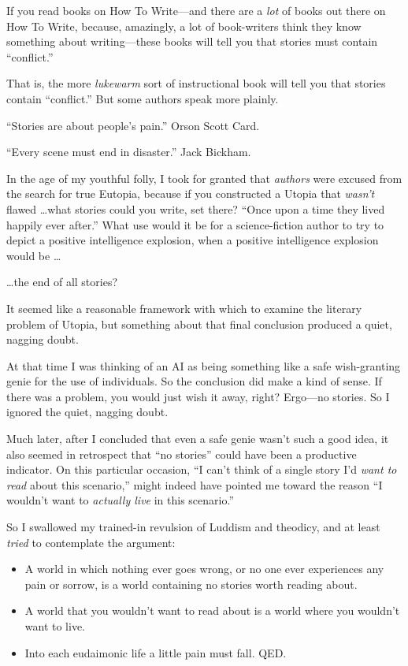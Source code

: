 {
 If you read books on How To Write---and there are a \textit{lot}
of books out there on How To Write, because, amazingly, a lot of
book-writers think they know something about writing---these books will
tell you that stories must contain
``conflict.''}

{
 That is, the more \textit{lukewarm} sort of instructional book
will tell you that stories contain
``conflict.'' But some authors speak
more plainly.}

{
 ``Stories are about people's
pain.'' Orson Scott Card.}

{
 ``Every scene must end in
disaster.'' Jack Bickham.}

{
 In the age of my youthful folly, I took for granted that
\textit{authors} were excused from the search for true Eutopia, because
if you constructed a Utopia that \textit{wasn't} flawed
\ldots what stories could you write, set there? ``Once
upon a time they lived happily ever after.'' What use
would it be for a science-fiction author to try to depict a positive
intelligence explosion, when a positive intelligence explosion would be
\ldots}

{
 \ldots the end of all stories?}

{
 It seemed like a reasonable framework with which to examine the
literary problem of Utopia, but something about that final conclusion
produced a quiet, nagging doubt.}

{
 At that time I was thinking of an AI as being something like a
safe wish-granting genie for the use of individuals. So the conclusion
did make a kind of sense. If there was a problem, you would just wish
it away, right? Ergo---no stories. So I ignored the quiet, nagging
doubt.}

{
 Much later, after I concluded that even a safe genie
wasn't such a good idea, it also seemed in retrospect
that ``no stories'' could have been
a productive indicator. On this particular occasion,
``I can't think of a single story
I'd \textit{want to read} about this
scenario,'' might indeed have pointed me toward the
reason ``I wouldn't want to
\textit{actually live} in this scenario.''}

{
 So I swallowed my trained-in revulsion of Luddism and theodicy,
and at least \textit{tried} to contemplate the argument:}

\begin{itemize}
\item {
 A world in which nothing ever goes wrong, or no one ever
experiences any pain or sorrow, is a world containing no stories worth
reading about.}

\item {
 A world that you wouldn't want to read about is a
world where you wouldn't want to live.}

\item {
  Into each eudaimonic life a little pain must fall. QED.}
\end{itemize}

